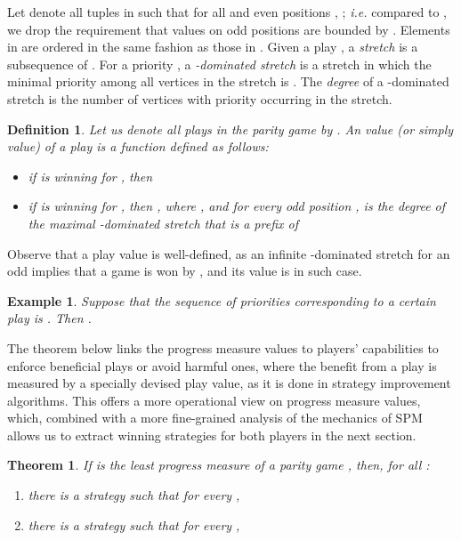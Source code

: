 \documentclass{eptcs}
\newtheorem{defi}{Definition}
\newtheorem{theo}{Theorem}
\newtheorem{exam}{Example}
\newenvironment{definition}{\begin{defi} \rm }{\end{defi}}
\newenvironment{theorem}{\begin{theo} \rm }{\end{theo}}
\newenvironment{example}{\begin{exam} \rm }{\end{exam}}
\newcommand{\ie}{\emph{i.e.}\xspace}
\begin{document}
Let  denote all tuples in 
such that for all  and even positions , ; \ie compared to , we drop the requirement that
values on odd positions  are bounded by . Elements in  are ordered in the same fashion as those in . Given a 
play , a \emph{stretch} is a subsequence
 of . For a priority , a
\emph{-dominated stretch} is a stretch in which the minimal
priority among all vertices in the stretch is . The \emph{degree}
of a -dominated stretch is the number of vertices with priority
 occurring in the stretch.
\begin{definition}
Let us denote all plays in the parity game by . An \emph{value} (or simply value) of a play is a function  defined as follows:
\begin{itemize}
 \item if  is winning for , then 
 \item if  is winning for , then , where 
 , and for every odd position ,  is the \emph{degree} of the maximal -dominated stretch that is a prefix of  
\end{itemize}
\end{definition}
Observe that a play value is well-defined, as an
infinite -dominated stretch for an odd  implies that a game
is won by , and its value is  in such case. 

\begin{example}
Suppose that the sequence of priorities corresponding to a certain
play  is . Then .

\end{example}
 
 
 
The theorem below links the progress measure values to players' capabilities to enforce beneficial plays or avoid harmful ones, where the benefit from a play is measured by a specially devised play value, as it is done in strategy improvement algorithms. 
This offers a more operational view on progress measure values, which, combined with a more fine-grained analysis of the mechanics of SPM allows us to extract winning strategies for both players in the next section.
 

\begin{theorem}
\label{thm:progint}
If  is the least progress measure of a parity game , then, for all :
\begin{enumerate}
 \item there is a strategy  such that for every , 
 \item there is a strategy  such that for every , 
\end{enumerate}
\end{theorem}
\end{document}
